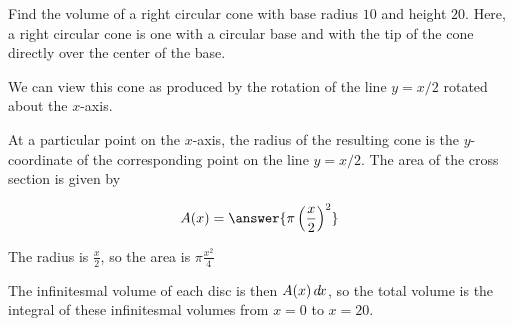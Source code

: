 \documentclass{ximera}
\begin{document}
\begin{example}
Find the volume of a right circular cone with base radius $10$ and
height $20$. Here, a right circular cone is one with a circular base and
with the tip of the cone directly over the center of the base.

\begin{image}
\end{image}

We can view this cone as produced by the rotation of the line
$y=x/2$ rotated about the $x$-axis.

At a particular point on the $x$-axis, the radius of the resulting
cone is the $y$-coordinate of the corresponding point on the line
$y=x/2$. The area of the cross section is given by

\begin{question}
\[
A(x) = \answer{\pi \left(\frac{x}{2}\right)^2}
\]

\begin{hint}
	The radius is $\frac{x}{2}$, so the area is $\pi \frac{x^2}{4}$
\end{hint}
\end{question}

The infinitesmal volume of each disc is then $A(x) \mathop{}\!d\! x$, so the total volume is the integral of these infinitesmal volumes from $x = 0$ to $x = 20$.


\end{example}
\end{document}
